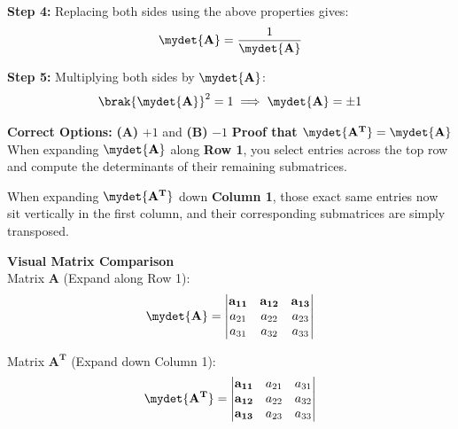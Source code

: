 \begin{enumerate}
\noindent \textbf{Step 4:} 
Replacing both sides using the above properties gives:
\begin{align}
\mydet{\mathbf{A}} = \frac{1}{\mydet{\mathbf{A}}}
\end{align}

\noindent  \textbf{Step 5:}
Multiplying both sides by $\mydet{\mathbf{A}}$:
 \begin{align}
\brak{\mydet{\mathbf{A}}}^2 = 1 \implies \mydet{\mathbf{A}} = \pm 1
\end{align} 


\noindent \textbf{Correct Options:} \textbf{(A)} $+1$ and \textbf{(B)} $-1$
\noindent \textbf{Proof that $\mydet{\mathbf{A^T}} = \mydet{\mathbf{A}}$} \\
\noindent When expanding $\mydet{\mathbf{A}}$ along \textbf{Row 1}, you select entries across the top row and compute the determinants of their remaining submatrices.

\vspace{0.3cm}

\noindent When expanding $\mydet{\mathbf{A^T}}$ down \textbf{Column 1}, those exact same entries now sit vertically in the first column, and their corresponding submatrices are simply transposed.

\vspace{0.8cm}

\noindent \textbf{Visual Matrix Comparison}\\

\noindent
Matrix $\mathbf{A}$ (Expand along Row 1):
\begin{align}
\mydet{\mathbf{A}} = 
\begin{vmatrix}
\mathbf{a_{11}} & \mathbf{a_{12}} & \mathbf{a_{13}} \\
a_{21} & a_{22} & a_{23} \\
a_{31} & a_{32} & a_{33}
\end{vmatrix}
\end{align}

\noindent
Matrix $\mathbf{A^T}$ (Expand down Column 1):
\begin{align}
\mydet{\mathbf{A^T}} = 
\begin{vmatrix}
\mathbf{a_{11}} & a_{21} & a_{31} \\
\mathbf{a_{12}} & a_{22} & a_{32} \\
\mathbf{a_{13}} & a_{23} & a_{33}
\end{vmatrix}
\end{align}

\vspace{0.5cm}


\end{enumerate}
